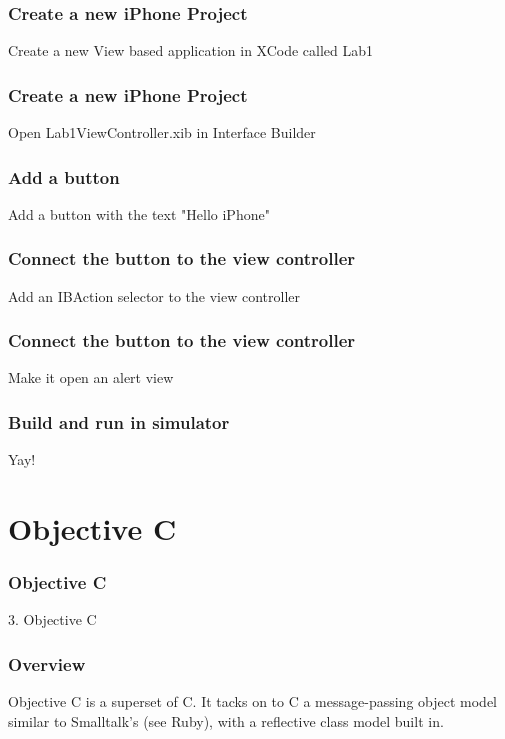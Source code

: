\documentclass[10pt]{beamer}
\begin{document}
    
\begin{frame}[fragile]
  \frametitle{Create a new iPhone Project}
  Create a new View based application in XCode called Lab1

\end{frame}

\begin{frame}[fragile]
  \frametitle{Create a new iPhone Project}
  Open Lab1ViewController.xib in Interface Builder

\end{frame}

    
\begin{frame}[fragile]
  \frametitle{Add a button}
  Add a button with the text "Hello iPhone"

\end{frame}

    
\begin{frame}[fragile]
  \frametitle{Connect the button to the view controller}
  Add an IBAction selector to the view controller

\end{frame}

\begin{frame}[fragile]
  \frametitle{Connect the button to the view controller}
  Make it open an alert view

\end{frame}

    
\begin{frame}[fragile]
  \frametitle{Build and run in simulator}
  Yay!

\end{frame}

    

   
  

  
    
\section{Objective C}
\begin{frame}[fragile]
  \frametitle{Objective C}
  3. Objective C
\end{frame}


    
\begin{frame}[fragile]
  \frametitle{Overview}
  Objective C is a superset of C. It tacks on to C a message-passing object model similar to Smalltalk's (see Ruby), with a reflective class model built in.

\end{frame}
\end{document}
